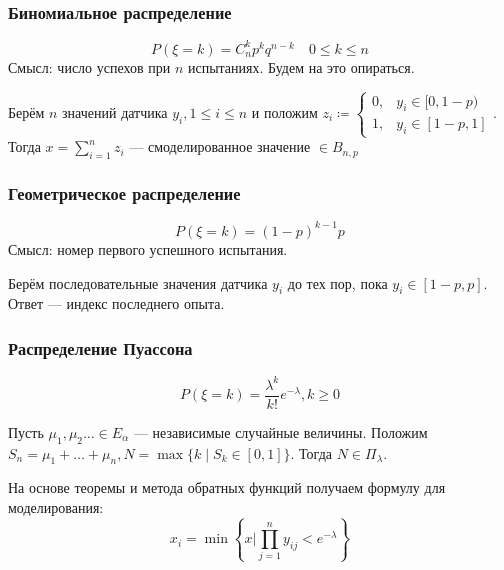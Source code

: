 \subsubsection{Биномиальное распределение}

\[P(\xi = k) = C_n^k p^k q^{n - k} \quad 0 \leq k \leq n\]
Смысл: число успехов при \(n\) испытаниях. Будем на это опираться.

Берём \(n\) значений датчика \(y_i, 1 \leq i \leq n\) и положим \(z_i \coloneqq \begin{cases}
    0, & y_i \in [0, 1 - p) \\
    1, & y_i \in [1 - p, 1]
\end{cases}\). Тогда \(x = \sum_{i=1}^{n} z_i\) --- смоделированное значение \(\in B_{n, p}\)

\subsubsection{Геометрическое распределение}

\[P(\xi = k) = (1 - p)^{k-1}p\]
Смысл: номер первого успешного испытания.

Берём последовательные значения датчика \(y_i\) до тех пор, пока \(y_i \in [1 - p, p]\). Ответ --- индекс последнего опыта.

\subsubsection{Распределение Пуассона}

\[P(\xi = k) = \frac{\lambda^k}{k!} e^{ - \lambda}, k \geq 0\]
\begin{theorem}
    Пусть \(\mu_1, \mu_2 \dots \in E_\alpha\) --- независимые случайные величины. Положим \(S_n = \mu_1 + \dots + \mu_n, N = \max \{k \mid S_k \in [0, 1]\}\). Тогда \(N \in \Pi_\lambda\).
\end{theorem}

На основе теоремы и метода обратных функций получаем формулу для моделирования:
\[x_i = \min \left\{x \mathrel{\Big|} \prod_{j=1}^{n} y_{ij} < e^{ - \lambda}\right\}\]

